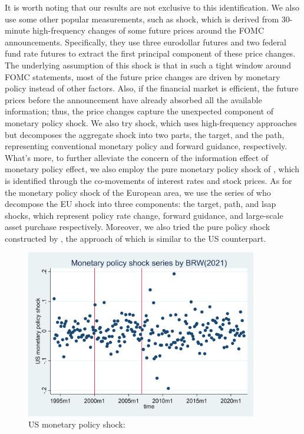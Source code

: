 It is worth noting that our results are not exclusive to this identification. We also use some other popular measurements, such as \cite{nakamura2018high} shock, which is derived from 30-minute high-frequency changes of some future prices around the FOMC announcements. Specifically, they use three eurodollar futures and two federal fund rate futures to extract the first principal component of these price changes. The underlying assumption of this shock is that in such a tight window around FOMC statements, most of the future price changes are driven by monetary policy instead of other factors. Also, if the financial market is efficient, the future prices before the announcement have already absorbed all the available information; thus, the price changes capture the unexpected component of monetary policy shock. We also try \cite{guraynak2005actions} shock, which uses high-frequency approaches but decomposes the aggregate shock into two parts, the target, and the path, representing conventional monetary policy and forward guidance, respectively. What's more, to further alleviate the concern of the information effect of monetary policy effect, we also employ the pure monetary policy shock of \cite{jarocinski2020deconstructing}, which is identified through the co-movements of interest rates and stock prices. As for the monetary policy shock of the European area, we use the series of \cite{miranda2022tale} who decompose the EU shock into three components: the target, path, and lsap shocks, which represent policy rate change, forward guidance, and large-scale asset purchase respectively. Moreover, we also tried the pure policy shock constructed by \cite{jarocinski2020deconstructing}, the approach of which is similar to the US counterpart.


\begin{figure}[H]
    \centering
    \includegraphics[width=0.9\textwidth]{latex/drafts/pic/BRW.png}
    \caption{\small US monetary policy shock: \cite{bu2021unified}}
    \label{fig: BRW}
\end{figure}


